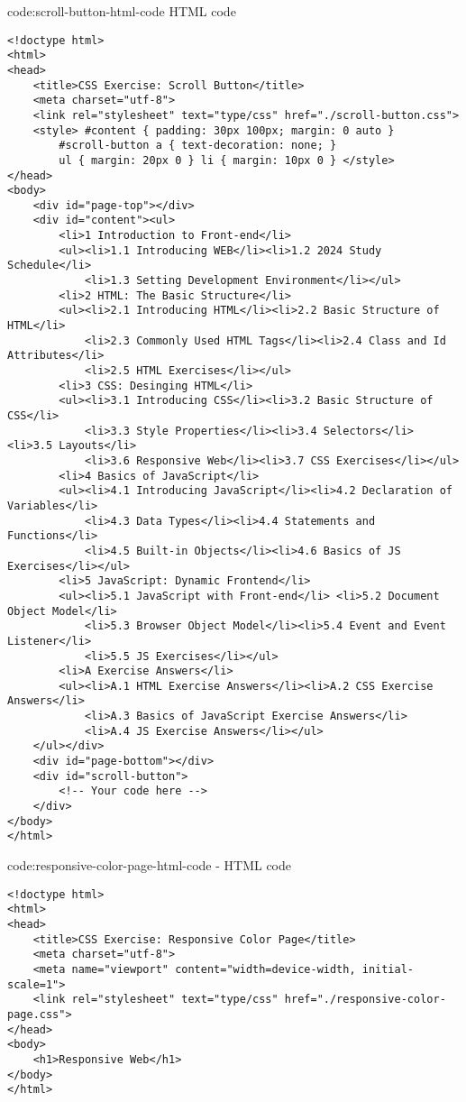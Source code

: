 \begin{code}{code:scroll-button-html-code}{ HTML code}
\begin{verbatim}
<!doctype html>
<html>
<head>
    <title>CSS Exercise: Scroll Button</title>
    <meta charset="utf-8">
    <link rel="stylesheet" text="type/css" href="./scroll-button.css">
    <style> #content { padding: 30px 100px; margin: 0 auto }
        #scroll-button a { text-decoration: none; }
        ul { margin: 20px 0 } li { margin: 10px 0 } </style>
</head>
<body>
    <div id="page-top"></div>
    <div id="content"><ul>
        <li>1 Introduction to Front-end</li>
        <ul><li>1.1 Introducing WEB</li><li>1.2 2024 Study Schedule</li>
            <li>1.3 Setting Development Environment</li></ul>
        <li>2 HTML: The Basic Structure</li>
        <ul><li>2.1 Introducing HTML</li><li>2.2 Basic Structure of HTML</li>
            <li>2.3 Commonly Used HTML Tags</li><li>2.4 Class and Id Attributes</li>
            <li>2.5 HTML Exercises</li></ul>
        <li>3 CSS: Desinging HTML</li>
        <ul><li>3.1 Introducing CSS</li><li>3.2 Basic Structure of CSS</li>
            <li>3.3 Style Properties</li><li>3.4 Selectors</li> <li>3.5 Layouts</li>
            <li>3.6 Responsive Web</li><li>3.7 CSS Exercises</li></ul>
        <li>4 Basics of JavaScript</li>
        <ul><li>4.1 Introducing JavaScript</li><li>4.2 Declaration of Variables</li>
            <li>4.3 Data Types</li><li>4.4 Statements and Functions</li>
            <li>4.5 Built-in Objects</li><li>4.6 Basics of JS Exercises</li></ul>
        <li>5 JavaScript: Dynamic Frontend</li>
        <ul><li>5.1 JavaScript with Front-end</li> <li>5.2 Document Object Model</li>
            <li>5.3 Browser Object Model</li><li>5.4 Event and Event Listener</li>
            <li>5.5 JS Exercises</li></ul>
        <li>A Exercise Answers</li>
        <ul><li>A.1 HTML Exercise Answers</li><li>A.2 CSS Exercise Answers</li>
            <li>A.3 Basics of JavaScript Exercise Answers</li>
            <li>A.4 JS Exercise Answers</li></ul>
    </ul></div>
    <div id="page-bottom"></div>
    <div id="scroll-button">
        <!-- Your code here -->
    </div>
</body>
</html>
\end{verbatim}
\end{code}

\begin{code}{code:responsive-color-page-html-code}{ - HTML code}
\begin{verbatim}
<!doctype html>
<html>
<head>
    <title>CSS Exercise: Responsive Color Page</title>
    <meta charset="utf-8">
    <meta name="viewport" content="width=device-width, initial-scale=1">
    <link rel="stylesheet" text="type/css" href="./responsive-color-page.css">
</head>
<body>
    <h1>Responsive Web</h1>
</body>
</html>
\end{verbatim}
\end{code}

